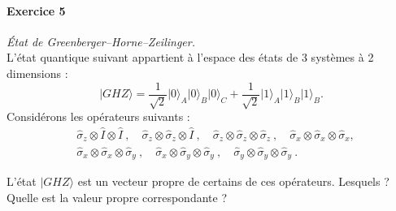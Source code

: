 \paragraph{Exercice 5} \textit{\'Etat de Greenberger–Horne–Zeilinger.} \\
L'état quantique suivant appartient à l'espace des états de 3 systèmes à 2 dimensions :
\begin{equation}
\vert GHZ \rangle = \frac{1}{\sqrt{2}}\vert 0 \rangle_A \vert 0 \rangle_B  \vert 0 \rangle_C+   \frac{1}{\sqrt{2}}\vert 1 \rangle_A \vert 1 \rangle_B \vert 1 \rangle_B .
\end{equation}
Considérons les opérateurs suivants :
\begin{equation}
\begin{split}
&\hat \sigma_z\otimes \hat I\otimes \hat I\ , \quad \hat \sigma_z\otimes \hat \sigma_z \otimes \hat I\ ,\quad \hat \sigma_z\otimes \hat \sigma_z \otimes \hat \sigma_z\ , \quad \hat \sigma_x\otimes \hat \sigma_x \otimes \hat \sigma_x,\\
&\hat \sigma_x\otimes \hat \sigma_x \otimes \hat \sigma_y\ , \quad  \hat \sigma_x\otimes \hat \sigma_y \otimes \hat \sigma_y\ , \quad  \hat \sigma_y\otimes \hat \sigma_y \otimes \hat \sigma_y\ .
\end{split}
\end{equation}


L'état $\vert GHZ \rangle $ est un vecteur propre de certains de ces opérateurs. Lesquels ? Quelle est la valeur propre correspondante ? 

